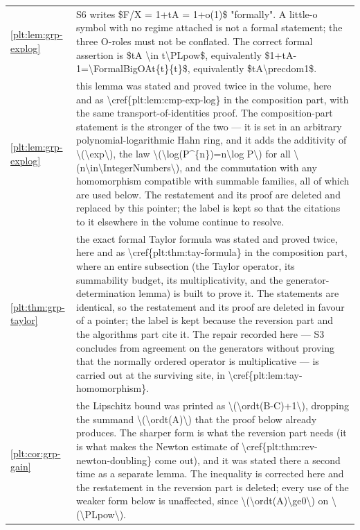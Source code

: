 \documentclass[11pt,oneside]{article}
\theoremstyle{plain}
\theoremstyle{definition}
\theoremstyle{remark}
\begin{document}
\begin{longtable}{@{}p{} p{}@{}}
\cref{plt:lem:grp-explog} & S6 writes \$F/X = 1+tA = 1+o(1)\$ "formally". A little-o symbol with no regime attached is not a formal statement; the three O-roles must not be conflated. The correct formal assertion is \$tA \textbackslash in t\textbackslash PLpow\$, equivalently \$1+tA-1=\textbackslash FormalBigOAt\{t\}\{t\}\$, equivalently \$tA\textbackslash precdom1\$.\\
\cref{plt:lem:grp-explog} & this lemma was stated and proved twice in the volume, here and as \textbackslash cref\{plt:lem:cmp-exp-log\} in the composition part, with the same transport-of-identities proof. The composition-part statement is the stronger of the two --- it is set in an arbitrary polynomial-logarithmic Hahn ring, and it adds the additivity of \textbackslash (\textbackslash exp\textbackslash ), the law \textbackslash (\textbackslash log(P\textasciicircum \{n\})=n\textbackslash log P\textbackslash ) for all \textbackslash (n\textbackslash in\textbackslash IntegerNumbers\textbackslash ), and the commutation with any homomorphism compatible with summable families, all of which are used below. The restatement and its proof are deleted and replaced by this pointer; the label is kept so that the citations to it elsewhere in the volume continue to resolve.\\
\cref{plt:thm:grp-taylor} & the exact formal Taylor formula was stated and proved twice, here and as \textbackslash cref\{plt:thm:tay-formula\} in the composition part, where an entire subsection (the Taylor operator, its summability budget, its multiplicativity, and the generator-determination lemma) is built to prove it. The statements are identical, so the restatement and its proof are deleted in favour of a pointer; the label is kept because the reversion part and the algorithms part cite it. The repair recorded here --- S3 concludes from agreement on the generators without proving that the normally ordered operator is multiplicative --- is carried out at the surviving site, in \textbackslash cref\{plt:lem:tay-homomorphism\}.\\
\cref{plt:cor:grp-gain} & the Lipschitz bound was printed as \textbackslash (\textbackslash ordt(B-C)+1\textbackslash ), dropping the summand \textbackslash (\textbackslash ordt(A)\textbackslash ) that the proof below already produces. The sharper form is what the reversion part needs (it is what makes the Newton estimate of \textbackslash cref\{plt:thm:rev-newton-doubling\} come out), and it was stated there a second time as a separate lemma. The inequality is corrected here and the restatement in the reversion part is deleted; every use of the weaker form below is unaffected, since \textbackslash (\textbackslash ordt(A)\textbackslash ge0\textbackslash ) on \textbackslash (\textbackslash PLpow\textbackslash ).\\

\end{longtable}
\end{document}
